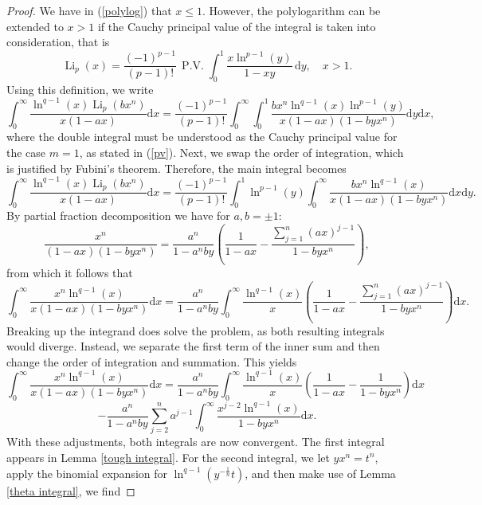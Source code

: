 \documentclass[11pt,reqno]{article}
\begin{document}
\begin{proof}
	We have in (\ref{polylog}) that $x\leqslant1$. However, the polylogarithm can be extended to $x>1$ if the Cauchy principal value of the integral is taken into consideration, that is
	\begin{equation}
		\operatorname{Li}_p(x) = \frac{{(-1)}^{p-1}}{(p-1)!} \,\operatorname{P.V.} \int_0^1 \frac{x \ln^{p-1}(y)}{1 - xy} \, \mathrm{d} y, \quad x > 1.\label{pv}
	\end{equation}
	Using this definition, we write
	\[\int_0^\infty\frac{\ln^{q-1}(x)\operatorname{Li}_p(bx^n)}{x(1-ax)}\mathrm{d} x=\frac{{(-1)}^{p-1}}{(p-1)!}\int_0^\infty\int_0^1\frac{bx^n\ln^{q-1}(x)\ln^{p-1}(y)}{x(1-ax)(1-byx^n)}\mathrm{d} y\mathrm{d} x,\]
	where the double integral must be understood as the Cauchy principal value for the case $m=1$, as stated in (\ref{pv}). 
	Next, we swap the order of integration, which is justified by Fubini's theorem. Therefore, the main integral becomes
	\begin{equation}
		\int_0^\infty\frac{\ln^{q-1}(x)\operatorname{Li}_p(bx^n)}{x(1-ax)}\mathrm{d} x=\frac{{(-1)}^{p-1}}{(p-1)!}\int_0^1\ln^{p-1}(y)\int_0^\infty\frac{bx^n\ln^{q-1}(x)}{x(1-ax)(1-byx^n)}\mathrm{d} x\mathrm{d} y.\label{main}
	\end{equation}
	By partial fraction decomposition we have for $a,b=\pm1$:
	\begin{equation}		\frac{x^{n}}{(1-ax)(1-byx^{n})}=\frac{a^n}{1-a^n by}\left(\frac{1}{1-ax}-\frac{\sum_{j=1}^n (ax)^{j-1}}{1-byx^{n}}\right),\label{pattern}
	\end{equation}
	from which it follows that
	\[\int_0^\infty\frac{x^{n}\ln^{q-1}(x)}{x(1-ax)(1-byx^{n})}\mathrm{d} x=\frac{a^n}{1-a^n by}\int_0^\infty\frac{\ln^{q-1}(x)}{x}\left(\frac{1}{1-ax}-\frac{\sum_{j=1}^n (ax)^{j-1}}{1-byx^{n}}\right)\mathrm{d} x.\]
	Breaking up the integrand does solve the problem, as both resulting integrals would diverge. Instead, we separate the first term of the inner sum and then change the order of integration and summation. This yields
	\[\int_0^\infty\frac{x^{n}\ln^{q-1}(x)}{x(1-ax)(1-byx^{n})}\mathrm{d} x=\frac{a^n}{1-a^n by}\int_0^\infty\frac{\ln^{q-1}(x)}{x}\left(\frac{1}{1-ax}-\frac{1}{1-byx^n}\right)\mathrm{d} x\]
	\[-\frac{a^n}{1-a^n by}\sum_{j=2}^n a^{j-1}\int_0^\infty\frac{x^{j-2}\ln^{q-1}(x)}{1-byx^n}\mathrm{d} x.\]
	With these adjustments, both integrals are now convergent. The first integral appears in Lemma \ref{tough integral}. For the second integral, we let $yx^n=t^n$, apply the binomial expansion for $\ln^{q-1}(y^{-\frac{1}{n}}t)$, and then make use of Lemma \ref{theta integral}, we find

\end{proof}
\end{document}
